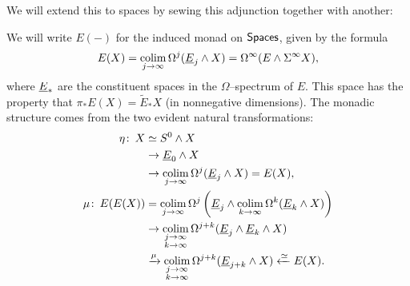 We will extend this to spaces by sewing this adjunction together with another:
\begin{center}
\end{center}
We will write $E(-)$ for the induced monad on $\mathsf{Spaces}$, given by the formula \[E(X) = \operatorname*{colim}_{j \to \infty} \Omega^j (\underline{\smash{E}}_{j} \wedge X) = \Omega^\infty (E \wedge \Sigma^\infty X),\] where $\underline{\smash{E}}_{*}$ are the constituent spaces in the $\Omega$--spectrum of $E$.  This space has the property that $\pi_* E(X) = \widetilde E_* X$ (in nonnegative dimensions).  The monadic structure comes from the two evident natural transformations:
\begin{align*}
\eta \colon\thinspace X & \simeq S^0 \wedge X \\
& \to \underline{\smash{E}}_{0} \wedge X \\
& \to \operatorname*{colim}_{j \to \infty} \Omega^j(\underline{\smash{E}}_{j} \wedge X) = E(X), \\
\mu \colon\thinspace E(E(X)) & = \operatorname*{colim}_{j \to \infty} \Omega^j \left( \underline{\smash{E}}_{j} \wedge \operatorname*{colim}_{k \to \infty} \Omega^k (\underline{\smash{E}}_{k} \wedge X) \right) \\
& \to \operatorname*{colim}_{\substack{j \to \infty \\ k \to \infty}} \Omega^{j+k} (\underline{\smash{E}}_{j} \wedge \underline{\smash{E}}_{k} \wedge X) \\
& \xrightarrow{\mu} \operatorname*{colim}_{\substack{j \to \infty \\ k \to \infty}} \Omega^{j+k} (\underline{\smash{E}}_{j+k} \wedge X) \xleftarrow{\simeq} E(X).
\end{align*}

